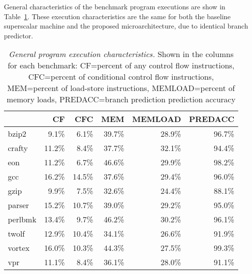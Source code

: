 \documentclass[10pt,dvips]{article}
\begin{document}
General characteristics of the benchmark program
executions
are show in Table~\ref{tab:general}.
These execution characteristics are the same for 
both the baseline superscalar machine
and the proposed microarchitecture, due to identical 
branch predictor.
%
\begin{table}[p]
\begin{center}
\caption{{\em General program execution characteristics.}
Shown in the columns for each benchmark:
CF=percent of any control flow instructions, 
CFC=percent of conditional control flow instructions, 
MEM=percent of load-store instructions,
MEMLOAD=percent of memory loads, 
PREDACC=branch prediction prediction accuracy}
\label{tab:general}
\vspace{+0.1in}
\scriptsize {
\begin{tabular}{|l||r|r|r|r|r|}
\hline 
 & CF & CFC & MEM & MEMLOAD & PREDACC \\
\hline

\hline
bzip2&
9.1\%	& 6.1\%	& 39.7\%	& 28.9\%	& 96.7\% \\

\hline
crafty&
11.2\%	& 8.4\%	& 37.7\%	& 32.1\%	& 94.4\% \\

\hline
eon&
11.2\%	& 6.7\%	& 46.6\%	& 29.9\%	& 98.2\% \\

\hline
gcc&
16.2\%	& 14.5\%	& 37.6\%	& 29.4\%	& 96.0\% \\

\hline
gzip&
9.9\%	& 7.5\%	& 32.6\%	& 24.4\%	& 88.1\% \\

\hline
parser&
15.2\%	& 10.7\%	& 39.0\%	& 29.2\%	& 95.0\% \\

\hline
perlbmk&
13.4\%	& 9.7\%	& 46.2\%	& 30.2\%	& 96.1\% \\

\hline
twolf&
12.9\%	& 10.4\%	& 34.1\%	& 26.6\%	& 91.9\% \\

\hline
vortex&
16.0\%	& 10.3\%	& 44.3\%	& 27.5\%	& 99.3\% \\

\hline
vpr&
11.1\%	& 8.4\%	& 36.1\%	& 28.0\%	& 91.1\% \\

\hline
\end{tabular}
}
\end{center}
\end{table}
%
\end{document}
